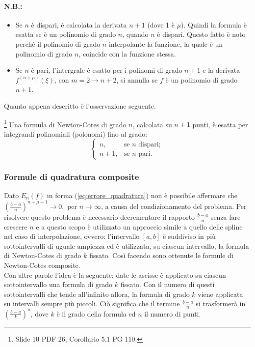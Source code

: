 \paragraph{N.B.:}
\begin{itemize}
	\item Se $n$ è dispari, è calcolata la derivata $n+1$ (dove 1 è $\mu$). Quindi la formula è esatta se è un polinomio di grado $n$, quando $n$ è dispari. Questo fatto è noto perché il polinomio di grado $n$ interpolante la funzione, la quale è un polinomio di grado $n$, coincide con la funzione stessa.
	\item Se $n$ è pari, l'intergrale è esatto per i polinomi di grado $n+1$ e la derivata $f^{(n+\mu)}(\xi)$, con $m=2\rightarrow n+2$, si annulla se $f$ è un polinomio di grado $n+1$.
\end{itemize}
Quanto appena descritto è l'osservazione seguente.

\begin{remark}
    \footnote{Slide 10 PDF 26, Corollario 5.1 PG 110.} Una formula di Newton-Cotes di grado $n$, calcolata su $n+1$ punti, è esatta per integrandi polinomiali (polonomi) fino al grado:
    \begin{equation*}
        \begin{cases}
            n, &\text{se $n$ dispari};\\
            n+1, &\text{se $n$ pari}.
        \end{cases}
    \end{equation*}
\end{remark}

\subsubsection{Formule di quadratura composite}
Dato $E_n(f)$ in forma (\ref{eq:errore_quadratura}) non è possibile affermare che $\left(\frac{b-a}{n}\right)^{n+\mu +1}\rightarrow 0,$ per $ n\rightarrow\infty$, a causa del condizionamento del problema. Per risolvere questo problema è necessario decrementare il rapporto $\frac{b-a}{n}$ senza fare crescere $n$ e a questo scopo è utilizzato un approccio simile a quello delle spline nel caso di interpolazione, ovvero: l'intervallo $[a,b]$ è suddiviso in più sottointervalli di uguale ampiezza ed è utilizzata, su ciascun intervallo, la formula di Newton-Cotes di grado $k$ fissato. Così facendo sono ottenute le formule di Newton-Cotes composite.\\
Con altre parole l'idea è la seguente: date le ascisse è applicato su ciascun sottointervallo una formula di grado $k$ fissato. Con il numero di questi sottointervalli che tende all'infinito allora, la formula di grado $k$ viene applicata su intervalli sempre più piccoli. Ciò significa che il termine $\frac{b-a}{n}$ si trasformerà in $\left(\frac{b-a}{k}\right)^n$, dove $k$ è il grado della formula ed $n$ il numero di punti.


